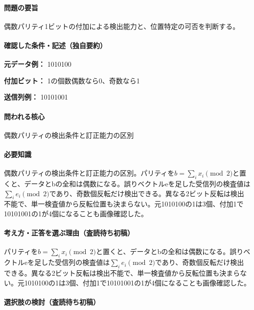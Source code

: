 \paragraph{問題の要旨} 偶数パリティ1ビットの付加による検出能力と、位置特定の可否を判断する。

\paragraph{確認した条件・記述（独自要約）}\mbox{}\par

\noindent\textbf{元データ例：} 1010100\par

\noindent\textbf{付加ビット：} 1の個数偶数なら0、奇数なら1\par

\noindent\textbf{送信列例：} 10101001\par

\paragraph{問われる核心} 偶数パリティの検出条件と訂正能力の区別

\paragraph{必要知識} 偶数パリティの検出条件と訂正能力の区別。パリティを\(b=\sum_ix_i\pmod2\)と置くと、データとbの全和は偶数になる。誤りベクトルeを足した受信列の検査値は\(\sum_ie_i\pmod2\)であり、奇数個反転だけ検出できる。異なる2ビット反転は検出不能で、単一検査値から反転位置も決まらない。元1010100の1は3個、付加1で10101001の1が4個になることも画像確認した。

\paragraph{考え方・正答を選ぶ理由（査読待ち初稿）} パリティを\(b=\sum_ix_i\pmod2\)と置くと、データとbの全和は偶数になる。誤りベクトルeを足した受信列の検査値は\(\sum_ie_i\pmod2\)であり、奇数個反転だけ検出できる。異なる2ビット反転は検出不能で、単一検査値から反転位置も決まらない。元1010100の1は3個、付加1で10101001の1が4個になることも画像確認した。

\paragraph{選択肢の検討（査読待ち初稿）}\mbox{}\par

